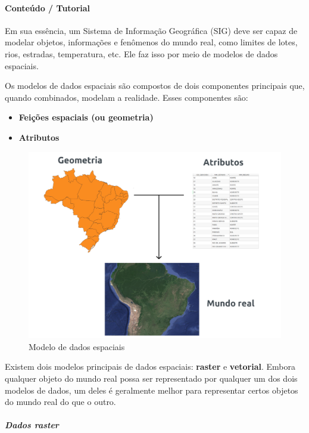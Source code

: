 \documentclass[
]{book}
\providecommand{\tightlist}{%
  \setlength{\itemsep}{0pt}\setlength{\parskip}{0pt}}
\begin{document}
\hypertarget{conteuxfado-tutorial-1}{%
\paragraph{Conteúdo / Tutorial}\label{conteuxfado-tutorial-1}}

Em sua essência, um Sistema de Informação Geográfica (SIG) deve ser capaz de modelar objetos, informações e fenômenos do mundo real, como limites de lotes, rios, estradas, temperatura, etc. Ele faz isso por meio de modelos de dados espaciais.

Os modelos de dados espaciais são compostos de dois componentes principais que, quando combinados, modelam a realidade. Esses componentes são:

\begin{itemize}
\tightlist
\item
  \textbf{Feições espaciais (ou geometria)}
\item
  \textbf{Atributos}
\end{itemize}

\begin{figure}
\centering
\includegraphics{media/modulo0/spatial-model.png}
\caption{Modelo de dados espaciais}
\end{figure}

Existem dois modelos principais de dados espaciais: \textbf{raster} e \textbf{vetorial}. Embora qualquer objeto do mundo real possa ser representado por qualquer um dos dois modelos de dados, um deles é geralmente melhor para representar certos objetos do mundo real do que o outro.

\hypertarget{dados-raster}{%
\subparagraph{Dados raster}\label{dados-raster}}
\end{document}
